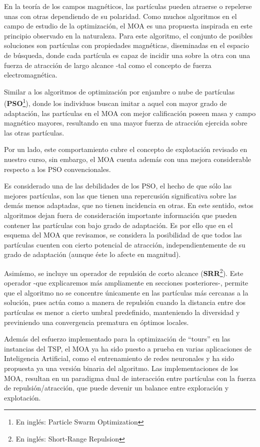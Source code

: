 \documentclass[12pt]{article}
\begin{document}
En la teoría de los campos magnéticos, las partículas pueden atraerse o repelerse unas con otras dependiendo de su polaridad.
Como muchos algoritmos en el campo de estudio de la optimización, el MOA es una propuesta inspirada en este principio observado en la naturaleza.
Para este algoritmo, el conjunto de posibles soluciones son partículas con propiedades magnéticas, diseminadas en el espacio de búsqueda, donde cada
partícula es capaz de incidir una sobre la otra con una fuerza de atracción de largo alcance -tal como el concepto de fuerza electromagnética.

Similar a los algoritmos de optimización por enjambre o nube de partículas (\textbf{PSO}\footnote{En inglés: Particle Swarm Optimization}), donde
los individuos buscan imitar a aquel con mayor grado de adaptación, las partículas en el MOA con mejor calificación poseen masa y campo
magnético mayores, resultando en una mayor fuerza de atracción ejercida sobre las otras partículas.

Por un lado, este comportamiento cubre el concepto de explotación revisado en nuestro curso, sin embargo, el MOA cuenta además con una mejora
considerable respecto a los PSO convencionales.

Es considerado una de las debilidades de los PSO, el hecho de que sólo las mejores partículas, son las que
tienen una repercusión significativa sobre las demás menos adaptadas, que no tienen incidencia en otras.
En este sentido, estos algoritmos dejan fuera de consideración importante información que pueden contener las partículas con bajo grado de
adaptación. Es por ello que en el esquema del MOA que revisamos, se considera la posibilidad de que todos las partículas cuenten con cierto
potencial de atracción, independientemente de su grado de adaptación (aunque éste lo afecte en magnitud).

Asimísmo, se incluye un operador de repulsión de corto alcance (\textbf{SRR}\footnote{En inglés: Short-Range Repulsion}). Este operador -que explicaremos más ampliamente en secciones posteriores-, permite que el algoritmo no se concentre únicamente en las partículas más cercanas a la solución, pues actúa como a manera de repulsión cuando la distancia entre dos partículas es menor a cierto umbral predefinido, manteniendo la diversidad y previniendo una convergencia prematura en óptimos locales.

Además del esfuerzo implementado para la optimización de ``tours'' en las instancias del TSP, el MOA ya ha sido puesto a prueba en varias aplicaciones de Inteligencia Artificial, como el entrenamiento de redes neuronales y ha sido propuesta ya una versión binaria del algoritmo.
Las implementaciones de los MOA, resultan en un paradigma dual de interacción entre partículas con la fuerza de repulsión/atracción, que puede
devenir un balance entre exploración y explotación.
\end{document}
